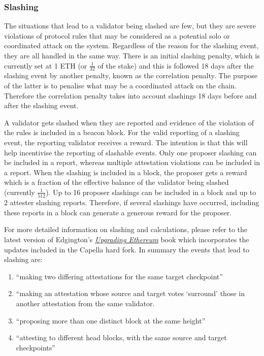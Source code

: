 \documentclass[UTF8]{article}
\begin{document}
\subsubsection*{Slashing}
The situations that lead to a validator being slashed are few, but they are severe violations of protocol rules that may be considered as a potential solo or coordinated attack on the system. Regardless of the reason for the slashing event, they are all handled in the same way. There is an initial slashing penalty, which is currently set at 1 ETH (or $\frac{1}{32}$ of the stake) and this is followed 18 days after the slashing event by another penalty, known as the correlation penalty. The purpose of the latter is to penalise what may be a coordinated attack on the chain. Therefore the correlation penalty takes into account slashings 18 days before and after the slashing event. 

A validator gets slashed when they are reported and evidence of the violation of the rules is included in a beacon block. For the valid reporting of a slashing event, the reporting validator receives a reward. The intention is that this will help incentivise the reporting of slashable events. Only one proposer slashing can be included in a report, whereas multiple attestation violations can be included in a report. When the slashing is included in a block, the proposer gets a reward which is a fraction of the effective balance of the validator being slashed (currently $\frac{1}{512}$). Up to 16 proposer slashings can be included in a block and up to 2 attester slashing reports.  Therefore, if several slashings have occurred, including these reports in a block can generate a generous reward for the proposer. 

For more detailed information on slashing and calculations, please refer to the latest version of Edgington's  \href{https://eth2book.info/capella/part2/incentives/slashing/}{\textit{Upgrading Ethereum}} book \cite{Edgington2023}  which incorporates the updates included in the Capella hard fork. In summary the events that lead to slashing are:

\begin{enumerate}
\item ``making two differing attestations for the same target checkpoint''
\item ``making an attestation whose source and target votes `surround' those in another attestation from the same validator.
\item ``proposing more than one distinct block at the same height''
\item ``attesting to different head blocks, with the same source and target checkpoints''
\end{enumerate}
\end{document}
